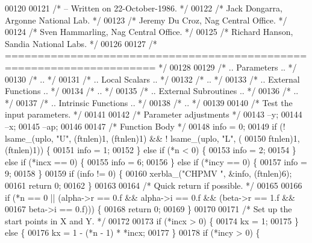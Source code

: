\begin{DoxyCode}
00120 
00121 \textcolor{comment}{/*  -- Written on 22-October-1986. */}
00122 \textcolor{comment}{/*     Jack Dongarra, Argonne National Lab. */}
00123 \textcolor{comment}{/*     Jeremy Du Croz, Nag Central Office. */}
00124 \textcolor{comment}{/*     Sven Hammarling, Nag Central Office. */}
00125 \textcolor{comment}{/*     Richard Hanson, Sandia National Labs. */}
00126 
00127 \textcolor{comment}{/*  ===================================================================== */}
00128 
00129 \textcolor{comment}{/*     .. Parameters .. */}
00130 \textcolor{comment}{/*     .. */}
00131 \textcolor{comment}{/*     .. Local Scalars .. */}
00132 \textcolor{comment}{/*     .. */}
00133 \textcolor{comment}{/*     .. External Functions .. */}
00134 \textcolor{comment}{/*     .. */}
00135 \textcolor{comment}{/*     .. External Subroutines .. */}
00136 \textcolor{comment}{/*     .. */}
00137 \textcolor{comment}{/*     .. Intrinsic Functions .. */}
00138 \textcolor{comment}{/*     .. */}
00139 
00140 \textcolor{comment}{/*     Test the input parameters. */}
00141 
00142     \textcolor{comment}{/* Parameter adjustments */}
00143     --y;
00144     --x;
00145     --ap;
00146 
00147     \textcolor{comment}{/* Function Body */}
00148     info = 0;
00149     \textcolor{keywordflow}{if} (! lsame\_(uplo, \textcolor{stringliteral}{"U"}, (ftnlen)1, (ftnlen)1) && ! lsame\_(uplo, \textcolor{stringliteral}{"L"}, (
00150         ftnlen)1, (ftnlen)1)) \{
00151     info = 1;
00152     \} \textcolor{keywordflow}{else} \textcolor{keywordflow}{if} (*n < 0) \{
00153     info = 2;
00154     \} \textcolor{keywordflow}{else} \textcolor{keywordflow}{if} (*incx == 0) \{
00155     info = 6;
00156     \} \textcolor{keywordflow}{else} \textcolor{keywordflow}{if} (*incy == 0) \{
00157     info = 9;
00158     \}
00159     \textcolor{keywordflow}{if} (info != 0) \{
00160     xerbla\_(\textcolor{stringliteral}{"CHPMV "}, &info, (ftnlen)6);
00161     \textcolor{keywordflow}{return} 0;
00162     \}
00163 
00164 \textcolor{comment}{/*     Quick return if possible. */}
00165 
00166     \textcolor{keywordflow}{if} (*n == 0 || (alpha->r == 0.f && alpha->i == 0.f && (beta->r == 1.f && 
00167                                                            beta->i == 0.f))) \{
00168     \textcolor{keywordflow}{return} 0;
00169     \}
00170 
00171 \textcolor{comment}{/*     Set up the start points in  X  and  Y. */}
00172 
00173     \textcolor{keywordflow}{if} (*incx > 0) \{
00174     kx = 1;
00175     \} \textcolor{keywordflow}{else} \{
00176     kx = 1 - (*n - 1) * *incx;
00177     \}
00178     \textcolor{keywordflow}{if} (*incy > 0) \{

\end{DoxyCode}
